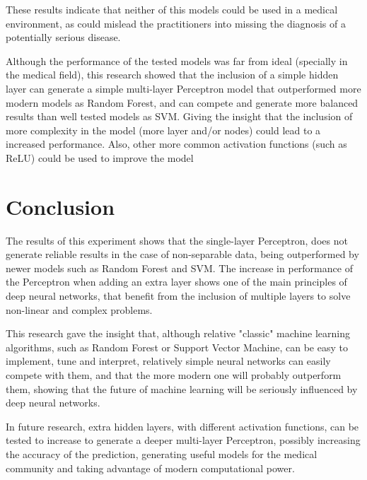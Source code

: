 \documentclass[10pt,twocolumn,letterpaper]{article}
\begin{document}
These results indicate that neither of this models could be used in a medical environment, as could mislead the practitioners into missing the diagnosis of a potentially serious disease. 

Although the performance of the tested models was far from ideal (specially in the medical field), this research showed that the inclusion of a simple hidden layer can generate a simple multi-layer Perceptron model that outperformed more modern models as Random Forest, and can compete and generate more balanced results than well tested models as SVM. Giving the insight that the inclusion of more complexity in the model (more layer and/or nodes) could lead to a increased performance. Also, other more common activation functions (such as ReLU) could be used to improve the model \cite{Skansi2018}


\section{Conclusion}

The results of this experiment shows that the single-layer Perceptron, does not generate reliable results in the case of non-separable data, being outperformed by newer models such as Random Forest and SVM. The increase in performance of the Perceptron when adding an extra layer shows one of the main principles of deep neural networks, that benefit from the inclusion of multiple layers to solve non-linear and complex problems.

This research gave the insight that, although relative "classic" machine learning algorithms, such as Random Forest or Support Vector Machine, can be easy to implement, tune and interpret, relatively simple neural networks can easily compete with them, and that the more modern one will probably outperform them, showing that the future of machine learning will be seriously influenced by deep neural networks.

In future research, extra hidden layers, with different activation functions, can be tested to increase to generate a deeper multi-layer Perceptron, possibly increasing the  accuracy of the prediction, generating useful models for the medical community and taking advantage of modern computational power.


{\small


}
\end{document}
